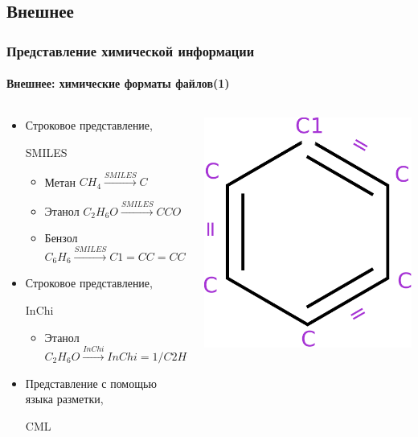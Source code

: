 \subsection{Внешнее}
\begin{frame}
  \frametitle{Представление химической информации}
  \framesubtitle{Внешнее: химические форматы файлов(1)}
  \begin{columns}
\begin{column}{0.7\textwidth}
  \begin{itemize}
    \item Строковое представление, \begin{tt}SMILES\end{tt}\footnotemark 
      \begin{itemize}
        \item Метан $ CH_4 \overset{SMILES}{\rightarrow} C $
        \item Этанол $ C_2H_6O \overset{SMILES}{\rightarrow} CCO $
        \item Бензол $ C_6H_6 \overset{SMILES}{\rightarrow} C1=CC=CC=C1 $
      \end{itemize}
    \item Строковое представление, \begin{tt}InChi\end{tt}\footnotemark
        \begin{itemize}
          \item Этанол \\ $ C_2H_6O \overset{InChi}{\rightarrow} InChi=1/C2H6O/c1-2-3/h3H,2H2,1H3 $
        \end{itemize}
      \item Представление с помощью языка разметки, \begin{tt}CML\end{tt}\footnotemark
            \end{itemize}
\end{column}
    \begin{column}{0.5\textwidth}
  \includegraphics[scale=0.4]{images/benzene.pdf}

\end{column}
\end{columns}
\end{frame}
